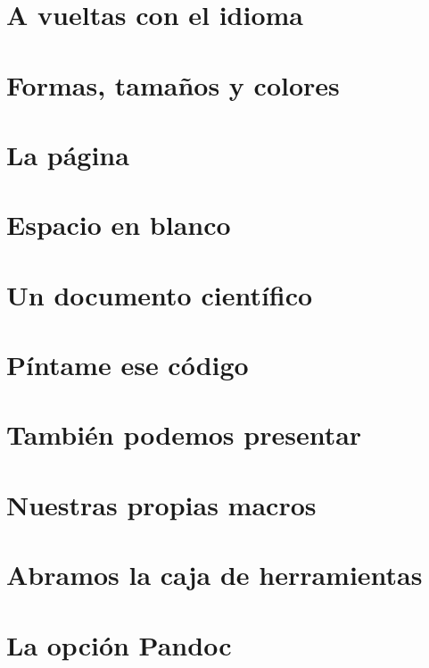 \documentclass[a4paper,10pt]{book}
\begin{document}
\chapter{A vueltas con el idioma}\label{ch:idioma}


\chapter{Formas, tamaños y colores}


\chapter{La página}


\chapter{Espacio en blanco}\label{ch:blanco}


\chapter{Un documento científico}


\chapter{Píntame ese código}


\chapter{También podemos presentar}


\chapter{Nuestras propias macros}


\chapter{Abramos la caja de herramientas}


\chapter{La opción Pandoc}

\end{document}
